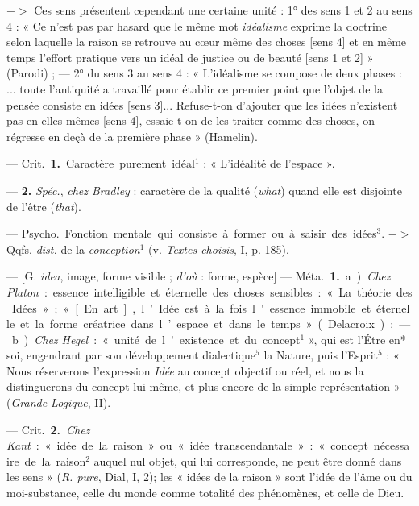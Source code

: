 \begin{itemize}[leftmargin=1cm, label=, itemsep=1pt]
$->$ Ces sens présentent cependant une certaine unité : 1° des sens 1 et 2
au sens 4 : « Ce n’est pas par hasard que le même mot {\it idéalisme}
exprime la doctrine selon laquelle la raison se retrouve au cœur même des
choses [sens 4] et en même temps l'effort pratique vers un idéal de justice
ou de beauté [sens 1 et 2] » (Parodi) ; — 2° du sens 3 au sens 4 : «
L’idéalisme se compose de deux phases : ... toute l'antiquité a travaillé
pour établir ce premier point que l’objet de la pensée consiste en idées
[sens 3]... Refuse-t-on d’ajouter que les idées n'existent pas en
elles-mêmes [sens 4], essaie-t-on de les traiter comme des choses, on
régresse en deçà de la première phase » (Hamelin).

 — \si{Crit.} {\bf 1.} Caractère purement idéal$^1$ : « L’idéalité de l’espace ».

— {\bf 2.} {\it Spéc.}, {\it chez Bradley} : caractère
de la qualité ({\it what}) quand elle est disjointe de l'être ({\it that}).

 — \si{Psycho.} Fonction mentale qui consiste à former ou à
saisir des idées$^3$. $->$ Qqfs. {\it dist.} de la {\it conception}$^1$
(v. {\it Textes choisis}, I, p. 185).

 — [G. {\it idea}, image, forme visible ; {\it d'où} : forme,
espèce] — \si{Méta.} {\bf 1.} a) {\it Chez Platon} : essence intelligible et
éternelle des choses sensibles : « La théorie des Idées »; « [En art],
l’Idée est à la fois l'essence immobile et éternelle et la forme créatrice
dans l’espace et dans le temps » (Delacroix); — b) {\it Chez Hegel} :
« unité de l'existence et du concept$^1$ », qui est l’Étre en* soi,
engendrant par son développement dialectique$^5$ la Nature, puis
l'Esprit$^5$ : « Nous réserverons l'expression {\it Idée} au concept
objectif ou réel, et nous la distinguerons du concept lui-même, et plus
encore de la simple représentation » ({\it Grande Logique}, II).

— \si{Crit.} {\bf 2.} {\it Chez Kant} : « idée de la raison » ou « idée
transcendantale » : « concept nécessaire de la raison$^2$ auquel nul objet,
qui lui corresponde, ne peut être donné dans les sens » ({\it R. pure},
Dial, I, 2); les « idées de la raison » sont l'idée de l’âme ou du
moi-substance, celle du monde comme totalité des phénomènes, et celle de
Dieu.


\end{itemize}
